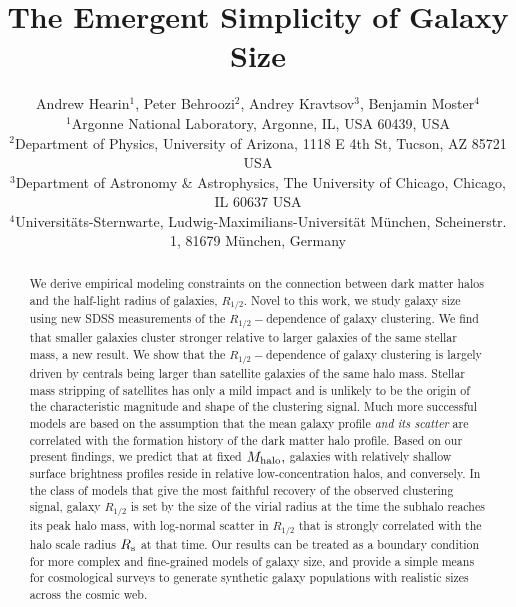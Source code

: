 \documentclass[usenatbib,usegraphicx,letterpaper]{mn2e}
\newcommand{\rhalf}{R_{1/2}}
\newcommand{\mhalo}{M_{\rm halo}}
\begin{document}
\title[The Emergent Simplicity of Galaxy Size]
{The Emergent Simplicity of Galaxy Size}


\author[Hearin, Behroozi, Kravtsov \& Moster]{
Andrew Hearin$^{1}$, Peter Behroozi$^{2}$, Andrey Kravtsov$^{3}$, Benjamin Moster$^{4}$\\
$^{1}$Argonne National Laboratory, Argonne, IL, USA 60439, USA\\
$^{2}$Department of Physics, University of Arizona, 1118 E 4th St, Tucson, AZ 85721 USA\\
$^{3}$Department of Astronomy \& Astrophysics, The University of Chicago, Chicago, IL 60637 USA\\
$^{4}$Universit{\"a}ts-Sternwarte, Ludwig-Maximilians-Universit{\"a}t M{\"u}nchen, Scheinerstr. 1, 81679 M{\"u}nchen, Germany
}

\maketitle

\begin{abstract}
We derive empirical modeling constraints on the connection between dark matter halos and the half-light radius of galaxies, $\rhalf.$ Novel to this work, we study galaxy size using new SDSS measurements of the $\rhalf-$dependence of galaxy clustering. We find that smaller galaxies cluster stronger relative to larger galaxies of the same stellar mass, a new result. We show that the $\rhalf-$dependence of galaxy clustering is largely driven by centrals being larger than satellite galaxies of the same halo mass. Stellar mass stripping of satellites has only a mild impact and is unlikely to be the origin of the characteristic magnitude and shape of the clustering signal. Much more successful models are based on the assumption that the mean galaxy profile {\em and its scatter} are correlated with the formation history of the dark matter halo profile. Based on our present findings, we predict that at fixed $\mhalo,$ galaxies with relatively shallow surface brightness profiles reside in relative low-concentration halos, and conversely. In the class of models that give the most faithful recovery of the observed clustering signal, galaxy $\rhalf$ is set by the size of the  virial radius at the time the subhalo reaches its peak halo mass, with log-normal scatter in $\rhalf$ that is strongly correlated with the halo scale radius $R_{\rm s}$ at that time. Our results can be treated as a boundary condition for more complex and fine-grained models of galaxy size, and provide a simple means for cosmological surveys to generate synthetic galaxy populations with realistic sizes across the cosmic web.
\end{abstract}
\end{document}
